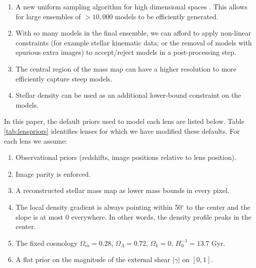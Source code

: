 \documentclass[useAMS,usenatbib]{mn2e}
\def\Glass{{\sc Glass}}
\def\PixeLens{{\sc PixeLens}}
\begin{document}
\begin{enumerate}
\item A new uniform sampling algorithm for high
    dimensional spaces \citep{2012MNRAS.425.3077L}. This allows for large
    ensembles of $>10,000$ models to be efficiently generated. 
\item With so many models in the final ensemble, we can afford to apply
    non-linear constraints (for example stellar kinematic data; or the removal of
    models with spurious extra images) to accept/reject models in a post-processing
    step.
\item The central region of the mass map can have a higher resolution to more
    efficiently capture steep models.
\item Stellar density can be used as an additional lower-bound constraint on the models. 
\end{enumerate} 

In this paper, the default priors used to model each lens are listed below.  Table
\ref{tab:lenspriors} identifies lenses for which we have modified these defaults.
For each lens we assume:

\begin{enumerate} 
\item Observational priors (redshifts, image positions relative to lens position).
\item Image parity is enforced.
\item A reconstructed stellar mass map as lower mass bounds in every pixel.
\item The local density gradient is always pointing within 50$^{\circ}$ to the center and the slope is at most 0 everywhere. In other words, the density profile peaks in the center.
\item The fixed cosmology $\Omega_{m} = 0.28$, $\Omega_{\Lambda} = 0.72$, $\Omega_{k} = 0$, $H_{0}^{-1} = 13.7$ Gyr.
\item A flat prior on the magnitude of the external shear $|\gamma|$ on $[0,1]$.
\end{enumerate}
\end{document}
